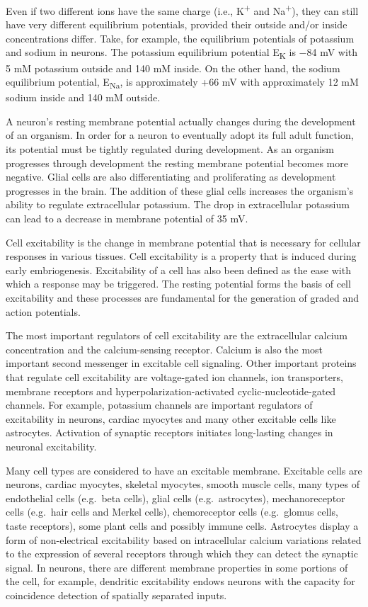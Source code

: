 Even if two different ions have the same charge (i.e., K\textsuperscript{+} and Na\textsuperscript{+}), they can still have very different equilibrium potentials, provided their outside and/or inside concentrations differ. Take, for example, the equilibrium potentials of potassium and sodium in neurons. The potassium equilibrium potential E\textsubscript{K} is −84 mV with 5 mM potassium outside and 140 mM inside. On the other hand, the sodium equilibrium potential, E\textsubscript{Na}, is approximately +66 mV with approximately 12 mM sodium inside and 140 mM outside.

A neuron's resting membrane potential actually changes during the development of an organism. In order for a neuron to eventually adopt its full adult function, its potential must be tightly regulated during development. As an organism progresses through development the resting membrane potential becomes more negative. Glial cells are also differentiating and proliferating as development progresses in the brain. The addition of these glial cells increases the organism's ability to regulate extracellular potassium. The drop in extracellular potassium can lead to a decrease in membrane potential of 35 mV.

Cell excitability is the change in membrane potential that is necessary for cellular responses in various tissues. Cell excitability is a property that is induced during early embriogenesis. Excitability of a cell has also been defined as the ease with which a response may be triggered. The resting potential forms the basis of cell excitability and these processes are fundamental for the generation of graded and action potentials.

The most important regulators of cell excitability are the extracellular calcium concentration and the calcium-sensing receptor. Calcium is also the most important second messenger in excitable cell signaling. Other important proteins that regulate cell excitability are voltage-gated ion channels, ion transporters, membrane receptors and hyperpolarization-activated cyclic-nucleotide-gated channels. For example, potassium channels are important regulators of excitability in neurons, cardiac myocytes and many other excitable cells like astrocytes. Activation of synaptic receptors initiates long-lasting changes in neuronal excitability.

Many cell types are considered to have an excitable membrane. Excitable cells are neurons, cardiac myocytes, skeletal myocytes, smooth muscle cells, many types of endothelial cells (e.g.~beta cells), glial cells (e.g.~astrocytes), mechanoreceptor cells (e.g.~hair cells and Merkel cells), chemoreceptor cells (e.g.~glomus cells, taste receptors), some plant cells and possibly immune cells. Astrocytes display a form of non-electrical excitability based on intracellular calcium variations related to the expression of several receptors through which they can detect the synaptic signal. In neurons, there are different membrane properties in some portions of the cell, for example, dendritic excitability endows neurons with the capacity for coincidence detection of spatially separated inputs.

